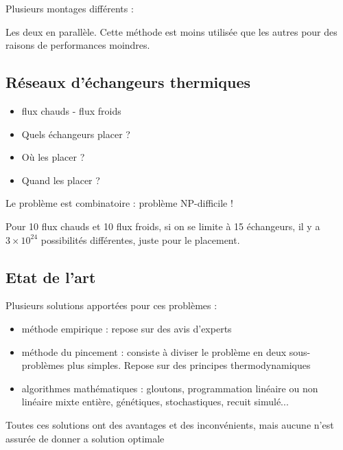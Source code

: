 \documentclass{beamer}
\begin{document}
\begin{frame}

Plusieurs montages différents :  \bigskip

Les deux en parallèle. Cette méthode est moins utilisée que les autres pour des raisons de
performances moindres.

\end{frame}

\subsection{Réseaux d'échangeurs thermiques}

\begin{frame}
\begin{itemize}
\item flux chauds - flux froids \pause
\item Quels échangeurs placer ?\pause
\item Où les placer ?\pause
\item Quand les placer ?\pause
\end{itemize}
Le problème est combinatoire : problème NP-difficile !\pause

Pour 10 flux chauds et 10 flux froids, si on se limite à 15 échangeurs, il y a $3\times 10^{24}$ possibilités différentes, juste pour le placement.
\end{frame}

\subsection{Etat de l'art}
\begin{frame}
Plusieurs solutions apportées pour ces problèmes : 

\begin{itemize}
\item méthode empirique : repose sur des avis d'experts \pause
\item méthode du pincement : consiste à diviser le problème en deux sous-problèmes plus simples. Repose sur des principes thermodynamiques \pause
\item algorithmes mathématiques : gloutons, programmation linéaire ou non linéaire mixte entière, génétiques, stochastiques, recuit simulé... \pause


\end{itemize}
Toutes ces solutions ont des avantages et des inconvénients, mais aucune n'est assurée de donner a solution optimale
\end{frame}
\end{document}
